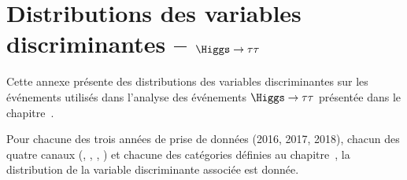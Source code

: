 \chapter{Distributions des variables discriminantes -- $\Higgs\to\tau\tau$}\label{annexe-discriminating_variables-HTT}

Cette annexe présente des distributions des variables discriminantes
sur les événements utilisés dans l'analyse des événements $\Higgs\to\tau\tau$
présentée dans le chapitre~.
\par
Pour chacune des trois années de prise de données (2016, 2017, 2018),
chacun des quatre canaux (\tauh\tauh, \mu\tauh, \ele\tauh, \ele\mu)
et
chacune des catégories définies au chapitre~,
la distribution de la variable discriminante associée est donnée.


